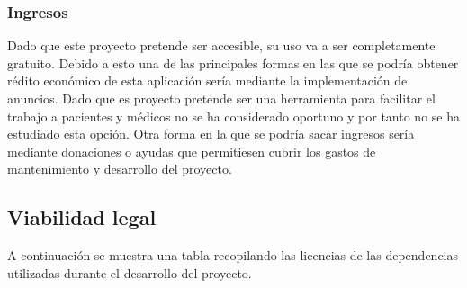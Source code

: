 \subsubsection{Ingresos}
Dado que este proyecto pretende ser accesible, su uso va a ser completamente gratuito. Debido a esto una de las principales formas en las que se podría obtener rédito económico de esta aplicación sería mediante la implementación de anuncios. Dado que es proyecto pretende ser una herramienta para facilitar el trabajo a pacientes y médicos no se ha considerado oportuno y por tanto no se ha estudiado esta opción. Otra forma en la que se podría sacar ingresos sería mediante donaciones o ayudas que permitiesen cubrir los gastos de mantenimiento y desarrollo del proyecto.

\subsection{Viabilidad legal}

A continuación se muestra una tabla recopilando las licencias de las dependencias utilizadas durante el desarrollo del proyecto.


